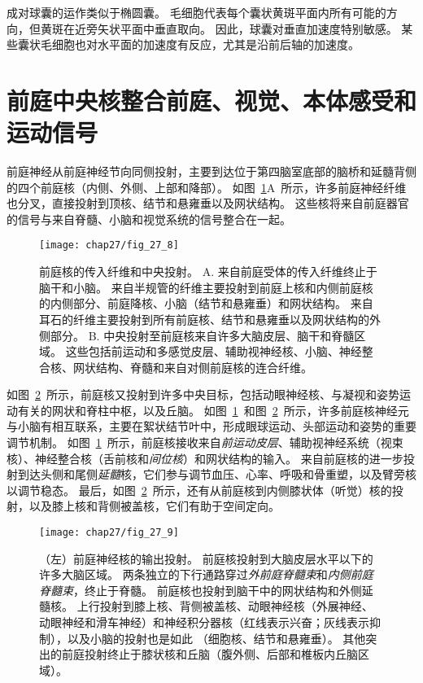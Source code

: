 成对球囊的运作类似于椭圆囊。
毛细胞代表每个囊状黄斑平面内所有可能的方向，但黄斑在近旁矢状平面中垂直取向。
因此，球囊对垂直加速度特别敏感。
某些囊状毛细胞也对水平面的加速度有反应，尤其是沿前后轴的加速度。



\section{前庭中央核整合前庭、视觉、本体感受和运动信号}

前庭神经从前庭神经节向同侧投射，主要到达位于第四脑室底部的脑桥和延髓背侧的四个前庭核（内侧、外侧、上部和降部）。
如图~\ref{fig:27_8}A~所示，许多前庭神经纤维也分叉，直接投射到顶核、结节和悬雍垂以及网状结构。
这些核将来自前庭器官的信号与来自脊髓、小脑和视觉系统的信号整合在一起。


\begin{figure}[htbp]
	\centering
	\texttt{[image: chap27/fig\_27\_8]}
	\caption{前庭核的传入纤维和中央投射。
		A. 来自前庭受体的传入纤维终止于脑干和小脑。
		来自半规管的纤维主要投射到前庭上核和内侧前庭核的内侧部分、前庭降核、小脑（结节和悬雍垂）和网状结构。
		来自耳石的纤维主要投射到所有前庭核、结节和悬雍垂以及网状结构的外侧部分\cite{gacek1974localization}。
		B. 中央投射至前庭核来自许多大脑皮层、脑干和脊髓区域。
		这些包括前运动和多感觉皮层、辅助视神经核、小脑、神经整合核、网状结构、脊髓和来自对侧前庭核的连合纤维。}
	\label{fig:27_8}
\end{figure}


如图~\ref{fig:27_9}~所示，前庭核又投射到许多中央目标，包括动眼神经核、与凝视和姿势运动有关的网状和脊柱中枢，以及丘脑。
如图~\ref{fig:27_8}~和图~\ref{fig:27_9}~所示，许多前庭核神经元与小脑有相互联系，主要在絮状结节叶中，形成眼球运动、头部运动和姿势的重要调节机制。
如图~\ref{fig:27_8}~所示，前庭核接收来自\textit{前运动皮层}、辅助视神经系统（视束核）、神经整合核（舌前核和\textit{间位核}）和网状结构的输入。
来自前庭核的进一步投射到达头侧和尾侧\textit{延髓}核，它们参与调节血压、心率、呼吸和骨重塑，以及臂旁核以调节稳态。
最后，如图~\ref{fig:27_9}~所示，还有从前庭核到内侧膝状体（听觉）核的投射，以及膝上核和背侧被盖核，它们有助于空间定向。


\begin{figure}[htbp]
	\centering
	\texttt{[image: chap27/fig\_27\_9]}
	\caption{（左）前庭神经核的输出投射。
		前庭核投射到大脑皮层水平以下的许多大脑区域。
		两条独立的下行通路穿过\textit{外前庭脊髓束}和\textit{内侧前庭脊髓束}，终止于脊髓。
		前庭核也投射到脑干中的网状结构和外侧延髓核。
		上行投射到膝上核、背侧被盖核、动眼神经核（外展神经、动眼神经和滑车神经）和神经积分器核（红线表示兴奋；灰线表示抑制），以及小脑的投射也是如此 （细胞核、结节和悬雍垂）。
		其他突出的前庭投射终止于膝状核和丘脑（腹外侧、后部和椎板内丘脑区域）。}
	\label{fig:27_9}
\end{figure}


